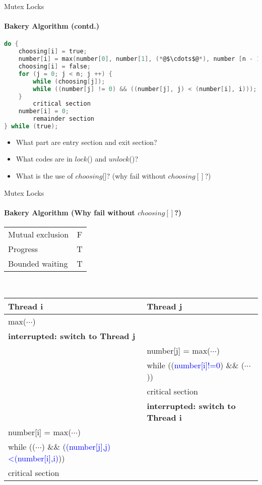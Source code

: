 \documentclass[10pt]{beamer}
\begin{document}
\begin{frame}[fragile]{Mutex Locks}
\framesubtitle{Bakery Algorithm (contd.)}
\begin{lstlisting}[language=C]
do { 
	choosing[i] = true;
	number[i] = max(number[0], number[1], (*@$\cdots$@*), number [n - 1]) + 1;
	choosing[i] = false;
	for (j = 0; j < n; j ++) {
		while (choosing[j]); 
		while ((number[j] != 0) && ((number[j], j) < (number[i], i))); 
	}
		critical section
	number[i] = 0;
		remainder section
} while (true);
\end{lstlisting}
\begin{itemize}
 
\item What part are entry section and exit section?
\item What codes are in $lock$() and $unlock$()?
\item What is the use of $choosing$[]? (why fail without $choosing[]$?)
\end{itemize}
\end{frame}

\begin{frame}{Mutex Locks}
\framesubtitle{Bakery Algorithm (Why fail without $choosing[]$?)}
\scriptsize
\begin{tabular}{|l|c|}
\hline
Mutual exclusion & F\\
Progress & T\\
Bounded waiting & T\\
\hline
\end{tabular}
\\
\vspace{2em}
\centering
\begin{tabular}{l l}
\textbf{Thread i}&\textbf{Thread j}\\
\hline
max($\cdots$) &\\
\textbf{interrupted: switch to Thread j} &\\
&number[j] = max($\cdots$)\\
&while ((\textcolor{blue}{number[i]!=0}) \&\& ($\cdots$))\\
&critical section\\
&\textbf{interrupted: switch to Thread i}\\
number[i] = max($\cdots$) & \\
while (($\cdots$) \&\& (\textcolor{blue}{(number[j],j)<(number[i],i)}))&\\
critical section&
\end{tabular}
\end{frame}
\end{document}
